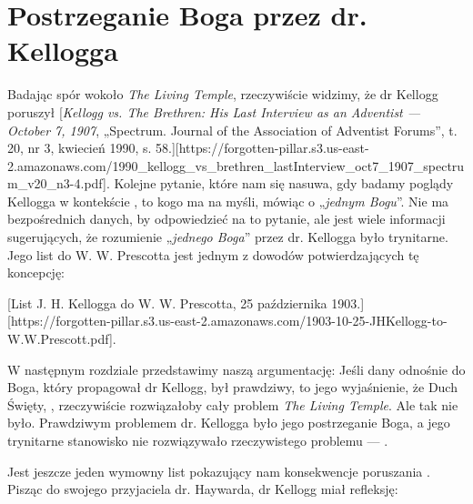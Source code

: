 \section*{Postrzeganie Boga przez dr. Kellogga}

Badając spór wokoło \textit{The Living Temple}, rzeczywiście widzimy, że dr Kellogg poruszył [\textit{Kellogg vs. The Brethren: His Last Interview as an Adventist — October 7, 1907}, „Spectrum. Journal of the Association of Adventist Forums”, t. 20, nr 3, kwiecień 1990, s. 58.][https://forgotten-pillar.s3.us-east-2.amazonaws.com/1990\_kellogg\_vs\_brethren\_lastInterview\_oct7\_1907\_spectrum\_v20\_n3-4.pdf]. Kolejne pytanie, które nam się nasuwa, gdy badamy poglądy Kellogga w kontekście , to kogo ma na myśli, mówiąc o „\textit{jednym Bogu}”. Nie ma bezpośrednich danych, by odpowiedzieć na to pytanie, ale jest wiele informacji sugerujących, że rozumienie „\textit{jednego Boga}” przez dr. Kellogga było trynitarne. Jego list do W. W. Prescotta jest jednym z dowodów potwierdzających tę koncepcję:

[List J. H. Kellogga do W. W. Prescotta, 25 października 1903.][https://forgotten-pillar.s3.us-east-2.amazonaws.com/1903-10-25-JHKellogg-to-W.W.Prescott.pdf].

W następnym rozdziale przedstawimy naszą argumentację: Jeśli dany  odnośnie do Boga, który propagował dr Kellogg, był prawdziwy, to jego wyjaśnienie, że Duch Święty, , rzeczywiście rozwiązałoby cały problem \textit{The Living Temple}. Ale tak nie było. Prawdziwym problemem dr. Kellogga było jego postrzeganie Boga, a jego trynitarne stanowisko nie rozwiązywało rzeczywistego problemu — .

Jest jeszcze jeden wymowny list pokazujący nam konsekwencje poruszania . Pisząc do swojego przyjaciela dr. Haywarda, dr Kellogg miał refleksję:

